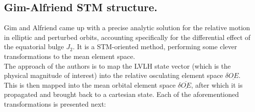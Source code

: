 	\subsection{Gim-Alfriend STM structure.}
	\indent Gim and Alfriend \cite{GA_STM} came up with a precise analytic solution for the relative motion in elliptic and perturbed orbits, accounting specifically for the differential effect of the equatorial bulge $J_2$. It is a STM-oriented method, performing some clever transformations to the mean element space. \\
	\indent The approach of the authors is to map the LVLH state vector (which is the physical magnitude of interest) into the relative osculating element space $\delta \underline{OE}$. This is then mapped into the mean orbital element space $\delta \underline{\overline{OE}}$, after which it is propagated and brought back to a cartesian state. Each of the aforementioned transformations is presented next:\\
